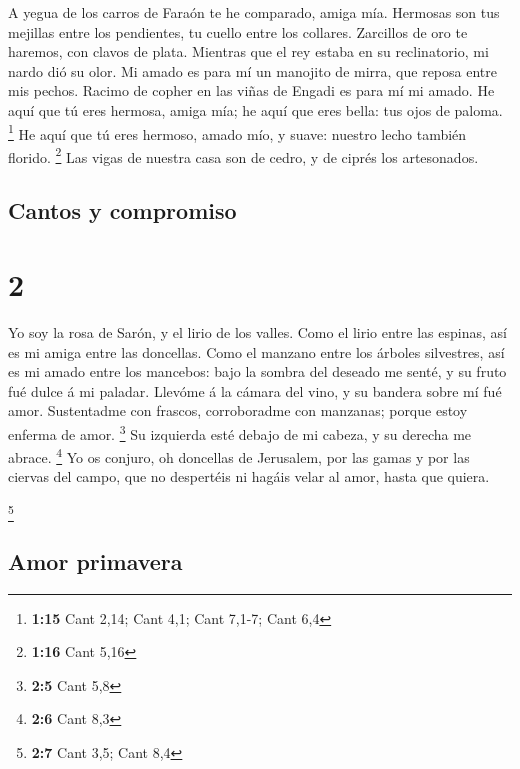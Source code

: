  A yegua de los carros de Faraón te he comparado, amiga
mía.  Hermosas son tus mejillas entre los pendientes, tu
cuello entre los collares.  Zarcillos de oro te haremos,
con clavos de plata.  Mientras que el rey estaba en su
reclinatorio, mi nardo dió su olor.  Mi amado es para mí
un manojito de mirra, que reposa entre mis pechos. 
Racimo de copher en las viñas de Engadi es para mí mi amado.
 He aquí que tú eres hermosa, amiga mía; he aquí que eres
bella: tus ojos de paloma. \footnote{\textbf{1:15} Cant 2,14; Cant 4,1;
  Cant 7,1-7; Cant 6,4}  He aquí que tú eres hermoso,
amado mío, y suave: nuestro lecho también florido. \footnote{\textbf{1:16}
  Cant 5,16}  Las vigas de nuestra casa son de cedro, y
de ciprés los artesonados.

\hypertarget{cantos-y-compromiso}{%
\subsection{Cantos y compromiso}\label{cantos-y-compromiso}}

\hypertarget{section-1}{%
\section{2}\label{section-1}}

 Yo soy la rosa de Sarón, y el lirio de los valles.
 Como el lirio entre las espinas, así es mi amiga entre
las doncellas.  Como el manzano entre los árboles
silvestres, así es mi amado entre los mancebos: bajo la sombra del
deseado me senté, y su fruto fué dulce á mi paladar. 
Llevóme á la cámara del vino, y su bandera sobre mí fué amor.
 Sustentadme con frascos, corroboradme con manzanas;
porque estoy enferma de amor. \footnote{\textbf{2:5} Cant 5,8}
 Su izquierda esté debajo de mi cabeza, y su derecha me
abrace. \footnote{\textbf{2:6} Cant 8,3}  Yo os conjuro,
oh doncellas de Jerusalem, por las gamas y por las ciervas del campo,
que no despertéis ni hagáis velar al amor, hasta que quiera.

\footnote{\textbf{2:7} Cant 3,5; Cant 8,4}

\hypertarget{amor-primavera}{%
\subsection{Amor primavera}\label{amor-primavera}}

